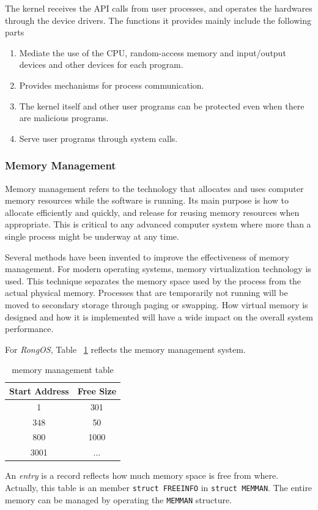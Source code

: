 \documentclass{swfcthesis}
\begin{document}
The kernel receives the API calls from user processes, and operates the hardwares through
the device drivers. The functions it provides mainly include the following parts
\begin{enumerate}
\item Mediate the use of the CPU, random-access memory and input/output devices and other
  devices for each program.
\item Provides mechanisms for process communication.
\item The kernel itself and other user programs can be protected even when there are
  malicious programs.
\item Serve user programs through system calls.
\end{enumerate}


\subsubsection{Memory Management}
\label{sec:memory-management-1}

Memory management refers to the technology that allocates and uses computer memory
resources while the software is running. Its main purpose is how to allocate efficiently
and quickly, and release for reusing memory resources when appropriate. This is critical
to any advanced computer system where more than a single process might be underway at any
time.

Several methods have been invented to improve the effectiveness of memory management. For
modern operating systems, memory virtualization technology is used. This technique
separates the memory space used by the process from the actual physical memory. Processes
that are temporarily not running will be moved to secondary storage through paging or
swapping. How virtual memory is designed and how it is implemented will have a wide impact
on the overall system performance.

For \emph{RongOS}, Table ~\ref{tab:memo-tab} reflects the memory management system. 
\begin{table}[!ht]
  \centering
  \begin{tabular}{c|c}
    \hline
    Start Address & Free Size \\
    \hline
    1 & 301 \\

    348 & 50 \\

    800 & 1000 \\

    3001 & ... \\
    \hline
  \end{tabular}
  \caption{memory management table}
  \label{tab:memo-tab}
\end{table}
An \emph{entry} is a record reflects how much memory space is free from where. Actually,
this table is an member \texttt{struct FREEINFO} in \texttt{struct MEMMAN}. The entire memory
can be managed by operating the \texttt{MEMMAN} structure.
\end{document}

